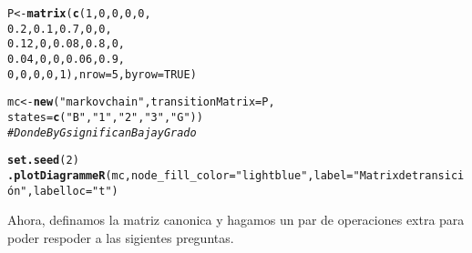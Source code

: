 \documentclass[11pt]{article}\usepackage[]{graphicx}\usepackage[table]{xcolor}
\makeatletter
\newcommand{\hlnum}[1]{\textcolor[rgb]{0.686,0.059,0.569}{#1}}%
\newcommand{\hlstr}[1]{\textcolor[rgb]{0.192,0.494,0.8}{#1}}%
\newcommand{\hlcom}[1]{\textcolor[rgb]{0.678,0.584,0.686}{\textit{#1}}}%
\newcommand{\hlstd}[1]{\textcolor[rgb]{0.345,0.345,0.345}{#1}}%
\newcommand{\hlkwb}[1]{\textcolor[rgb]{0.69,0.353,0.396}{#1}}%
\newcommand{\hlkwc}[1]{\textcolor[rgb]{0.333,0.667,0.333}{#1}}%
\newcommand{\hlkwd}[1]{\textcolor[rgb]{0.737,0.353,0.396}{\textbf{#1}}}%
\newenvironment{kframe}{%
 \def\at@end@of@kframe{}%
 \ifinner\ifhmode%
  \def\at@end@of@kframe{\end{minipage}}%
  \begin{minipage}{\columnwidth}%
 \fi\fi%
 \def\FrameCommand##1{\hskip\@totalleftmargin \hskip-\fboxsep
 \colorbox{shadecolor}{##1}\hskip-\fboxsep
     \hskip-\linewidth \hskip-\@totalleftmargin \hskip\columnwidth}%
 \MakeFramed {\advance\hsize-\width
   \@totalleftmargin\z@ \linewidth\hsize
   \@setminipage}}%
 {\par\unskip\endMakeFramed%
 \at@end@of@kframe}
\newenvironment{knitrout}{}{} %
\makeatother
\begin{document}
\begin{knitrout}
\color{fgcolor}\begin{kframe}
\begin{alltt}
\hlstd{P} \hlkwb{<-} \hlkwd{matrix}\hlstd{(}\hlkwd{c}\hlstd{(}\hlnum{1}\hlstd{,}\hlnum{0}\hlstd{,}\hlnum{0}\hlstd{,}\hlnum{0}\hlstd{,}\hlnum{0}\hlstd{,}
              \hlnum{0.2}\hlstd{,}\hlnum{0.1}\hlstd{,}\hlnum{0.7}\hlstd{,}\hlnum{0}\hlstd{,}\hlnum{0}\hlstd{,}
              \hlnum{0.12}\hlstd{,}\hlnum{0}\hlstd{,}\hlnum{0.08}\hlstd{,}\hlnum{0.8}\hlstd{,}\hlnum{0}\hlstd{,}
              \hlnum{0.04}\hlstd{,}\hlnum{0}\hlstd{,}\hlnum{0}\hlstd{,}\hlnum{0.06}\hlstd{,}\hlnum{0.9}\hlstd{,}
              \hlnum{0}\hlstd{,}\hlnum{0}\hlstd{,}\hlnum{0}\hlstd{,}\hlnum{0}\hlstd{,}\hlnum{1}\hlstd{),} \hlkwc{nrow} \hlstd{=} \hlnum{5}\hlstd{,} \hlkwc{byrow} \hlstd{=} \hlnum{TRUE}\hlstd{)}

 \hlstd{mc} \hlkwb{<-} \hlkwd{new}\hlstd{(}\hlstr{"markovchain"}\hlstd{,} \hlkwc{transitionMatrix} \hlstd{= P,}
           \hlkwc{states} \hlstd{=} \hlkwd{c}\hlstd{(}\hlstr{"B"}\hlstd{,}\hlstr{"1"}\hlstd{,}\hlstr{"2"}\hlstd{,}\hlstr{"3"}\hlstd{,}\hlstr{"G"}\hlstd{))}
\hlcom{#Donde B y G significan Baja y Grado}

\hlkwd{set.seed}\hlstd{(}\hlnum{2}\hlstd{)}
\hlkwd{.plotDiagrammeR}\hlstd{(mc,} \hlkwc{node_fill_color} \hlstd{=} \hlstr{"lightblue"}\hlstd{,} \hlkwc{label} \hlstd{=} \hlstr{"Matrix de transición"}\hlstd{,} \hlkwc{labelloc} \hlstd{=} \hlstr{"t"}\hlstd{)}
\end{alltt}


{\ttfamily\noindent\bfseries\color{errorcolor}{\#\# Error in loadNamespace(name): there is no package called 'webshot'}}\end{kframe}
\end{knitrout}

Ahora, definamos la matriz canonica y hagamos un par de operaciones extra para poder respoder a las sigientes preguntas. 
\end{document}
